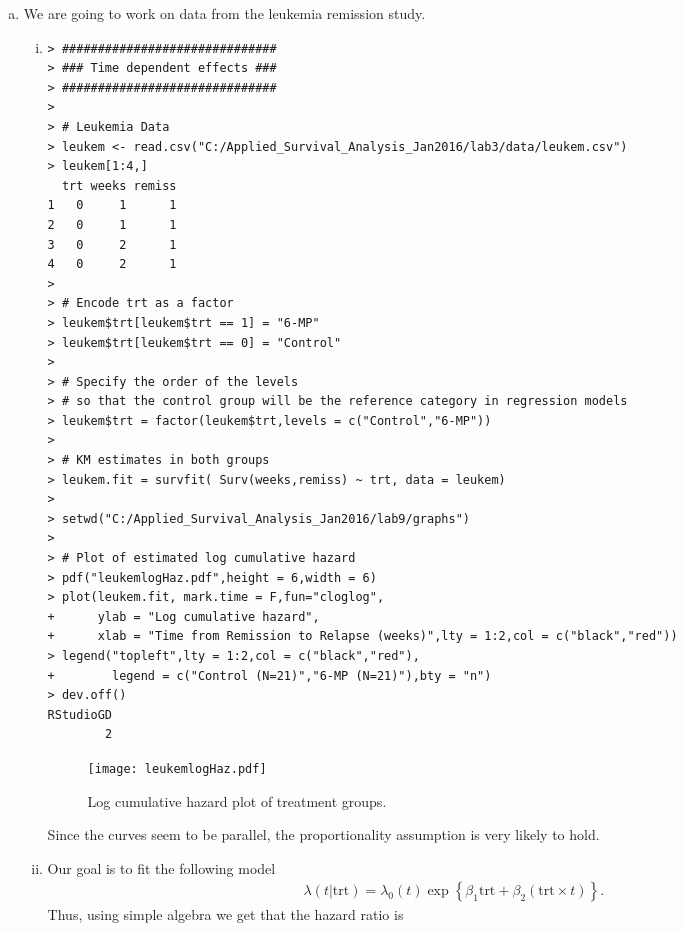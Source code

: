 \begin{enumerate}[(a)]
\begin{enumerate}[(i)]
\end{enumerate}
\item We are going to work on data from the leukemia remission study.
\begin{enumerate}[(i)]
\item 
\begin{spacing}{1.2}
\begin{footnotesize}
\begin{verbatim}
> ##############################
> ### Time dependent effects ###
> ##############################
> 
> # Leukemia Data
> leukem <- read.csv("C:/Applied_Survival_Analysis_Jan2016/lab3/data/leukem.csv")
> leukem[1:4,]
  trt weeks remiss
1   0     1      1
2   0     1      1
3   0     2      1
4   0     2      1
> 
> # Encode trt as a factor
> leukem$trt[leukem$trt == 1] = "6-MP"
> leukem$trt[leukem$trt == 0] = "Control"
> 
> # Specify the order of the levels
> # so that the control group will be the reference category in regression models
> leukem$trt = factor(leukem$trt,levels = c("Control","6-MP"))
> 
> # KM estimates in both groups
> leukem.fit = survfit( Surv(weeks,remiss) ~ trt, data = leukem)
> 
> setwd("C:/Applied_Survival_Analysis_Jan2016/lab9/graphs")
> 
> # Plot of estimated log cumulative hazard
> pdf("leukemlogHaz.pdf",height = 6,width = 6)
> plot(leukem.fit, mark.time = F,fun="cloglog",
+      ylab = "Log cumulative hazard",
+      xlab = "Time from Remission to Relapse (weeks)",lty = 1:2,col = c("black","red"))
> legend("topleft",lty = 1:2,col = c("black","red"),
+        legend = c("Control (N=21)","6-MP (N=21)"),bty = "n")
> dev.off()
RStudioGD 
        2 
\end{verbatim}
\end{footnotesize}
\end{spacing}
\begin{figure}[htbp]
	\centering
		\texttt{[image: leukemlogHaz.pdf]}
	\caption{Log cumulative hazard plot of treatment groups.}
	\label{figure1}
\end{figure}
Since the curves seem to be parallel, the proportionality assumption is very likely to hold.
\newpage 
\item Our goal is to fit the following model
\begin{align}
\lambda(t|\text{trt}) = \lambda_{0}(t)\exp\left\{\beta_{1}\text{trt}
+\beta_{2}(\text{trt}\times t)\right\}.\nonumber
\end{align}
Thus, using simple algebra we get that the hazard ratio is
\begin{align}

\end{align}
\end{enumerate}
\end{enumerate}
